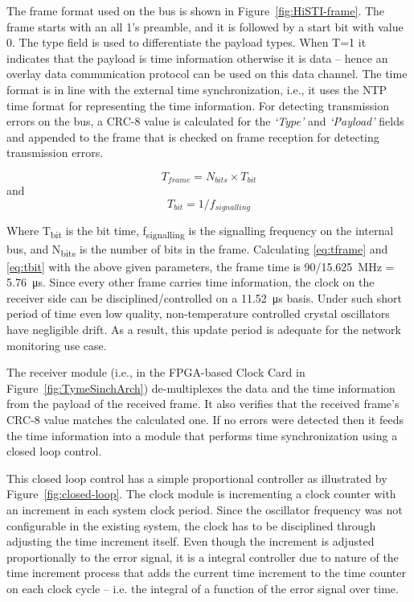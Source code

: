 \documentclass[journal]{IEEEtran}
\begin{document}
The frame format used on the bus is shown in Figure~\ref{fig:HiSTI-frame}. The frame starts with an all 1's preamble, and it is
followed by a start bit with value 0. The type field is used to differentiate the payload types. When T=1 it
indicates that the payload is
time information otherwise it is data -- hence an overlay data communication protocol can be used on this data channel.
The time format is in line with the external time synchronization, i.e., it uses the NTP
time format for representing the time information. For detecting transmission errors on the bus, a CRC-8 value is
calculated
for the \emph{`Type'} and \emph{`Payload'} fields and appended to the frame that is checked on frame reception for
detecting
transmission errors.

\begin{equation}\label{eq:tframe}
T_{frame} = N_{bits} \times T_{bit}
\end{equation}
and
\begin{equation}\label{eq:tbit}
T_{bit} = 1/f_{signalling}
\end{equation}

Where T\textsubscript{bit} is the bit time, f\textsubscript{signalling} is the signalling frequency on the internal bus, and N\textsubscript{bits} is the number of bits in the frame.
Calculating \eqref{eq:tframe} and \eqref{eq:tbit} with the above given parameters, the frame time is 90/\SI{15.625}{\mega\hertz} = \SI{5.76}{\micro\second}. Since every
other frame carries time information, the clock on the receiver side can be disciplined/controlled on a
\SI{11.52}{\micro\second}
basis. Under such short period of time even low quality, non-temperature controlled crystal oscillators have negligible
drift.
As a result, this update period is adequate for the network monitoring use case.

The receiver module (i.e., in the FPGA-based Clock Card in Figure~\ref{fig:TymeSinchArch}) de-multiplexes the data and the time information from the payload of the received frame. It also
verifies that the received frame's CRC-8 value matches the calculated one. If no errors were detected then it feeds the
time information into a module that performs time synchronization using a closed loop control.

This closed loop control has a simple proportional controller as illustrated by Figure~\ref{fig:closed-loop}. The clock
module
is incrementing a clock counter with an increment in each system clock period. Since the oscillator frequency was not
configurable in the
existing system, the clock has to be disciplined through adjusting the time increment itself.
Even though the increment is adjusted proportionally to the error signal, it is a integral controller due to nature of
the time increment process that adds the current time increment to the time counter on each clock cycle
-- i.e. the integral of a function of the error signal over time.
\end{document}
